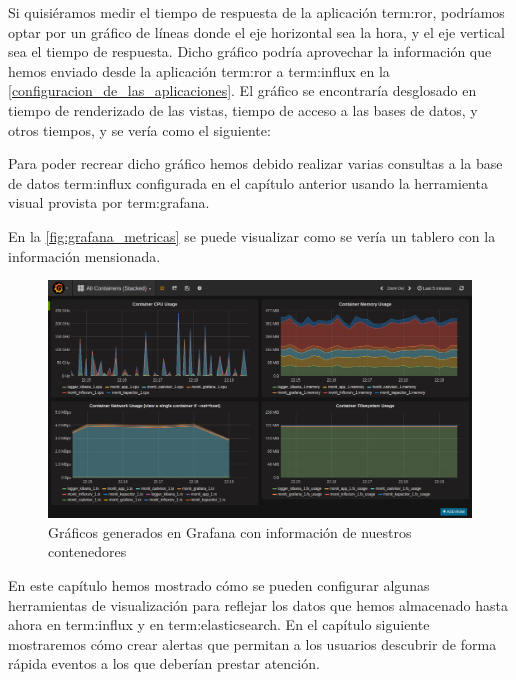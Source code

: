 Si quisiéramos medir el tiempo de respuesta de la aplicación \gls{term:ror},
podríamos optar por un gráfico de líneas donde el eje horizontal sea la hora, y
el eje vertical sea el tiempo de respuesta. Dicho gráfico podría aprovechar la
información que hemos enviado desde la aplicación \gls{term:ror} a
\gls{term:influx} en la \autoref{configuracion_de_las_aplicaciones}. El gráfico
se encontraría desglosado en tiempo de renderizado de las vistas, tiempo de
acceso a las bases de datos, y otros tiempos, y se vería como el siguiente:

Para poder recrear dicho gráfico hemos debido realizar varias consultas a la
base de datos \gls{term:influx} configurada en el capítulo anterior usando la
herramienta visual provista por \gls{term:grafana}.

En la \autoref{fig:grafana_metricas} se puede visualizar como se vería un
tablero con la información mensionada.

\begin{figure}
  \includegraphics[width=\linewidth]{src/images/05-capitulo-5/grafana_metricas.png}
  \caption{Gráficos generados en Grafana con información de nuestros contenedores}
  \label{fig:grafana_metricas}
\end{figure}

En este capítulo hemos mostrado cómo se pueden configurar algunas herramientas
de visualización para reflejar los datos que hemos almacenado hasta ahora en
\gls{term:influx} y en \gls{term:elasticsearch}. En el capítulo siguiente
mostraremos cómo crear alertas que permitan a los usuarios descubrir de forma
rápida eventos a los que deberían prestar atención.
